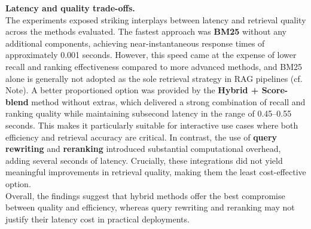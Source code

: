 \begin{spacing}{1.5}
\noindent \textbf{Latency and quality trade-offs.}\\
The experiments exposed striking interplays between latency and retrieval quality across the methods evaluated. The fastest approach was \textbf{BM25} without any additional components, achieving near-instantaneous response times of approximately 0.001 seconds. However, this speed came at the expense of lower recall and ranking effectiveness compared to more advanced methods, and BM25 alone is generally not adopted as the sole retrieval strategy in RAG pipelines (cf. Note). A better proportioned option was provided by the \textbf{Hybrid + Score-blend} method without extras, which delivered a strong combination of recall and ranking quality while maintaining subsecond latency in the range of 0.45--0.55 seconds. This makes it particularly suitable for interactive use cases where both efficiency and retrieval accuracy are critical. In contrast, the use of \textbf{query rewriting} and \textbf{reranking} introduced substantial computational overhead, adding several seconds of latency. Crucially, these integrations did not yield meaningful improvements in retrieval quality, making them the least cost-effective option.\\

\noindent Overall, the findings suggest that hybrid methods offer the best compromise between quality and efficiency, whereas query rewriting and reranking may not justify their latency cost in practical deployments.



\end{spacing}
